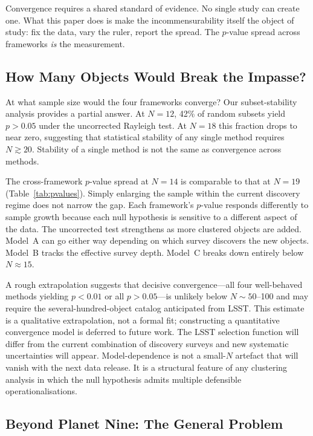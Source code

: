 \documentclass{aa}
\begin{document}
Convergence requires a shared standard of evidence. No single study can create one. What this paper does is make the incommensurability itself the object of study: fix the data, vary the ruler, report the spread. The $p$-value spread across frameworks \textit{is} the measurement.

\subsection{How Many Objects Would Break the Impasse?}

At what sample size would the four frameworks converge? Our subset-stability analysis provides a partial answer. At $N=12$, 42\% of random subsets yield $p>0.05$ under the uncorrected Rayleigh test. At $N=18$ this fraction drops to near zero, suggesting that statistical stability of any single method requires $N\gtrsim20$. Stability of a single method is not the same as convergence across methods.

The cross-framework $p$-value spread at $N=14$ is comparable to that at $N=19$ (Table~\ref{tab:pvalues}). Simply enlarging the sample within the current discovery regime does not narrow the gap. Each framework's $p$-value responds differently to sample growth because each null hypothesis is sensitive to a different aspect of the data. The uncorrected test strengthens as more clustered objects are added. Model~A can go either way depending on which survey discovers the new objects. Model~B tracks the effective survey depth. Model~C breaks down entirely below $N\approx15$.


A rough extrapolation suggests that decisive convergence---all four well-behaved methods yielding $p<0.01$ or all $p>0.05$---is unlikely below $N\sim50$--100 and may require the several-hundred-object catalog anticipated from LSST. This estimate is a qualitative extrapolation, not a formal fit; constructing a quantitative convergence model is deferred to future work. The LSST selection function will differ from the current combination of discovery surveys and new systematic uncertainties will appear. Model-dependence is not a small-$N$ artefact that will vanish with the next data release. It is a structural feature of any clustering analysis in which the null hypothesis admits multiple defensible operationalisations.

\subsection{Beyond Planet Nine: The General Problem}
\end{document}
